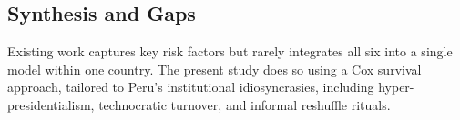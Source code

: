 \documentclass[a4paper, 12pt]{article}
\begin{document}
\subsection{Synthesis and Gaps}
Existing work captures key risk factors but rarely integrates all six into a single model within one country. The present study does so using a Cox survival approach, tailored to Peru’s institutional idiosyncrasies, including hyper-presidentialism, technocratic turnover, and informal reshuffle rituals.



% 
% 
% 
% 
% 
\end{document}
